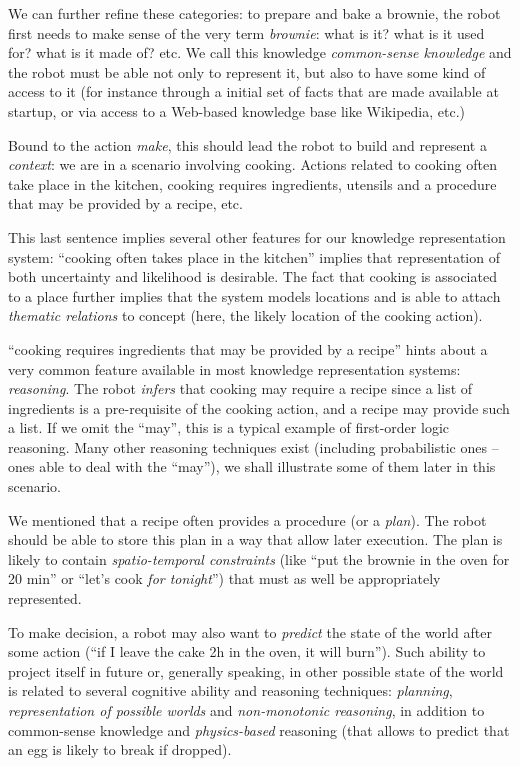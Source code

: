 \documentclass[a4paper, twocolumn]{article}
\begin{document}
We can further refine these categories: to prepare and bake a brownie, the
robot first needs to make sense of the very term \emph{brownie}: what is it?
what is it used for? what is it made of? etc. We call this knowledge
\emph{common-sense knowledge} and the robot must be able not only to represent
it, but also to have some kind of access to it (for instance through a initial
set of facts that are made available at startup, or via access to a Web-based
knowledge base like Wikipedia, etc.)

Bound to the action \emph{make}, this should lead the robot to build and
represent a \emph{context}: we are in a scenario involving cooking. Actions
related to cooking often take place in the kitchen, cooking requires ingredients, 
utensils and a procedure that may be provided by a recipe, etc.

This last sentence implies several other features for our knowledge
representation system: ``cooking often takes place in the kitchen'' implies
that representation of both uncertainty and likelihood is desirable. The fact
that cooking is associated to a place further implies that the system models
locations and is able to attach \emph{thematic relations} to concept
(here, the likely location of the cooking action).

``cooking requires ingredients that may be provided by a recipe'' hints about a
very common feature available in most knowledge representation systems:
\emph{reasoning}. The robot \emph{infers} that cooking may require a recipe
since a list of ingredients is a pre-requisite of the cooking action, and a
recipe may provide such a list. If we omit the ``may'', this is a typical
example of first-order logic reasoning. Many other reasoning techniques exist
(including probabilistic ones -- ones able to deal with the ``may''), we shall
illustrate some of them later in this scenario.

We mentioned that a recipe often provides a procedure (or a \emph{plan}). The
robot should be able to store this plan in a way that allow later execution.
The plan is likely to contain \emph{spatio-temporal constraints} (like ``put
the brownie in the oven for 20 min'' or ``let's cook \emph{for tonight}'') that
must as well be appropriately represented.

To make decision, a robot may also want to \emph{predict} the state of the world
after some action (``if I leave the cake 2h in the oven, it will burn'').
Such ability to project itself in future or, generally speaking, in other
possible state of the world is related to several cognitive ability and
reasoning techniques: \emph{planning}, \emph{representation of possible worlds}
and \emph{non-monotonic reasoning}, in addition to common-sense knowledge and
\emph{physics-based} reasoning (that allows to predict that an egg is likely to
break if dropped).
\end{document}
